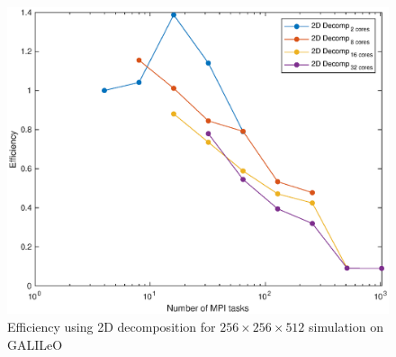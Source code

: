 \begin{figure}
\begin{center}
\includegraphics[scale=0.55]{grafici/galileo_efficiency}
\caption{Efficiency using 2D decomposition for $256\times 256\times 512$ simulation on GALILeO}
\label{galileo:efficiency}
\end{center}
\end{figure}


